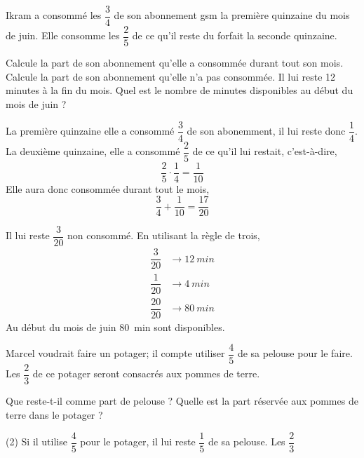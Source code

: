 \documentclass[a4paper,fontsize=12pt, parskip=half]{scrartcl}
\begin{document}
\begin{exercise}
    Ikram a consommé les $\dfrac{3}{4}$ de son abonnement gsm
    la première quinzaine du mois de juin.
    Elle consomme les $\dfrac{2}{5}$ de ce qu'il reste du forfait
    la seconde quinzaine.
    \begin{tasks}
        \task Calcule la part de son abonnement qu'elle a consommée durant tout
        son mois.
        \task Calcule la part de son abonnement qu'elle n'a pas consommée.
        \task Il lui reste 12 minutes à la fin du mois. Quel est le nombre de
        minutes disponibles au début du mois de juin ?
    \end{tasks}
\end{exercise}
\begin{solution}
    \begin{tasks}
        \task La première quinzaine elle a consommé $\dfrac{3}{4}$ de son
        abonemment, il lui reste donc $\dfrac{1}{4}$. La deuxième quinzaine,
        elle a consommé $\dfrac{2}{5}$ de ce qu'il lui restait, c'est-à-dire,
        \begin{equation*}
            \dfrac{2}{5}\cdot\dfrac{1}{4} = \dfrac{1}{10}
        \end{equation*}
        Elle aura donc consommée durant tout le mois,
        \begin{equation*}
            \dfrac{3}{4} + \dfrac{1}{10} = \dfrac{17}{20}
        \end{equation*}

        \task Il lui reste $\dfrac{3}{20}$ non consommé.
        \task En utilisant la règle de trois,
        \begin{align*}
            \dfrac{3}{20}  & \longrightarrow \SI{12}{min} \\
            \dfrac{1}{20}  & \longrightarrow \SI{4}{min}  \\
            \dfrac{20}{20} & \longrightarrow \SI{80}{min}
        \end{align*}
        Au début du mois de juin \SI{80}{min} sont disponibles.
    \end{tasks}
\end{solution}

\begin{exercise}
    Marcel voudrait faire un potager; il compte utiliser $\dfrac{4}{5}$ de sa pelouse pour le faire. Les $\dfrac{2}{3}$ de ce potager seront
    consacrés aux pommes de terre.
    \begin{tasks}
        \task Que reste-t-il comme part de pelouse ?
        \task Quelle est la part réservée aux pommes de terre dans le potager ?
    \end{tasks}
\end{exercise}
\begin{solution}
    \begin{tasks}(2)
        \task Si il utilise $\dfrac{4}{5}$ pour le potager, il lui reste
        $\dfrac{1}{5}$ de sa pelouse.
        \task Les $\dfrac{2}{3}$
    \end{tasks}
\end{solution}
\end{document}
